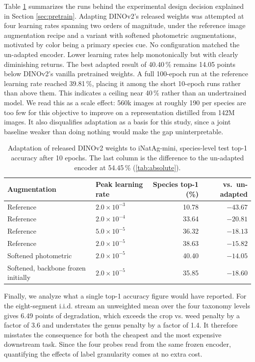 \documentclass[english]{lni}
\begin{document}
Table \ref{tab:adaptation} summarizes the runs behind the experimental design decision explained in Section \ref{sec:pretrain}. Adapting DINOv2's released weights was attempted at four learning rates spanning two orders of magnitude, under the reference image augmentation recipe and a variant with softened photometric augmentations, motivated by color being a primary species cue. No configuration matched the un-adapted encoder. Lower learning rates help monotonically but with clearly diminishing returns. The best adapted result of 40.40\,\% remains 14.05 points below DINOv2's vanilla pretrained weights. A full 100-epoch run at the reference learning rate reached 39.81\,\%, placing it among the short 10-epoch runs rather than above them. This indicates a ceiling near 40\,\% rather than an undertrained model. We read this as a scale effect: 560k images at roughly 190 per species are too few for this objective to improve on a representation distilled from 142M images. It also disqualifies adaptation as a basis for this study, since a joint baseline weaker than doing nothing would make the gap uninterpretable.

\begin{table}
\centering\footnotesize
\begin{tabular}{llrr}
\toprule
Augmentation & Peak learning rate & Species top-1 (\%) & vs.\ un-adapted \\
\midrule
Reference & $2.0 \times 10^{-3}$ & 10.78 & $-43.67$ \\
Reference & $2.0 \times 10^{-4}$ & 33.64 & $-20.81$ \\
Reference & $5.0 \times 10^{-5}$ & 36.32 & $-18.13$ \\
Reference & $2.0 \times 10^{-5}$ & 38.63 & $-15.82$ \\
Softened photometric & $2.0 \times 10^{-5}$ & 40.40 & $-14.05$ \\
Softened, backbone frozen initially & $2.0 \times 10^{-5}$ & 35.85 & $-18.60$ \\
\bottomrule
\end{tabular}
\caption{Adaptation of released DINOv2 weights to iNatAg-mini, species-level test top-1 accuracy after 10 epochs. The last column is the difference to the un-adapted encoder at 54.45\,\% (\cref{tab:absolute}).}
\label{tab:adaptation}
\end{table}

Finally, we analyze what a single top-1 accuracy figure would have reported. For the eight-segment i.i.d. stream an unweighted mean over the four taxonomy levels gives 6.49 points of degradation, which exceeds the crop vs. weed penalty by a factor of 3.6 and understates the genus penalty by a factor of 1.4. It therefore misstates the consequence for both the cheapest and the most expensive downstream task. Since the four probes read from the same frozen encoder, quantifying the effects of label granularity comes at no extra cost.
\end{document}
